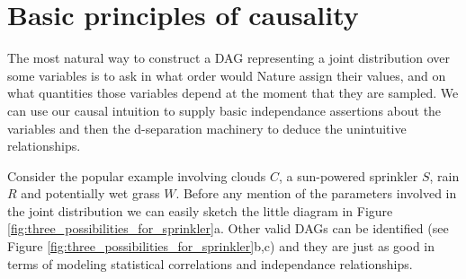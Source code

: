 \documentclass[a4paper, 10pt]{article}
\begin{document}
\section{Basic principles of causality}
\label{sec:basics}


The most natural way to construct a DAG representing a joint distribution
over some variables is to ask in what order would Nature assign their values,
and on what quantities those variables depend at the moment that they are
sampled. We can use our causal intuition to supply basic independance
assertions about the variables and then the d-separation machinery to
deduce the unintuitive relationships.

Consider the popular example involving clouds $C$, a sun-powered
sprinkler $S$, rain $R$ and potentially wet grass $W$. Before any mention of
the parameters involved in the joint distribution we can easily sketch the
little diagram in Figure \ref{fig:three_possibilities_for_sprinkler}a. Other
valid DAGs can be identified (see Figure
\ref{fig:three_possibilities_for_sprinkler}b,c) and they are just as good in
terms of modeling statistical correlations and independance relationships.
\end{document}
